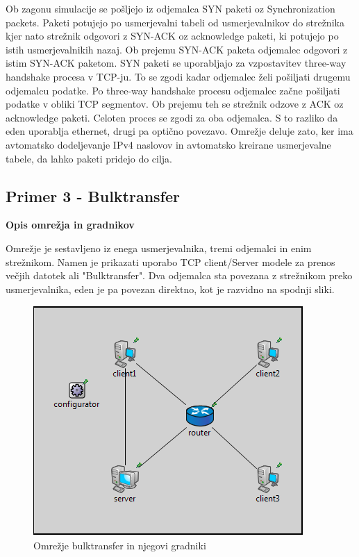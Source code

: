 \documentclass[11pt, a4paper, slovene]{book}
\begin{document}
Ob zagonu simulacije se pošljejo iz odjemalca SYN paketi oz Synchronization packets. Paketi potujejo po usmerjevalni tabeli od usmerjevalnikov do strežnika kjer nato strežnik odgovori z SYN-ACK oz acknowledge paketi, ki potujejo po istih usmerjevalnikih nazaj. Ob prejemu SYN-ACK paketa odjemalec odgovori z istim SYN-ACK paketom. SYN paketi se uporabljajo za vzpostavitev three-way handshake procesa v TCP-ju. To se zgodi kadar odjemalec želi pošiljati drugemu odjemalcu podatke. Po three-way handshake procesu odjemalec začne pošiljati podatke v obliki TCP segmentov. Ob prejemu teh se strežnik odzove z ACK oz acknowledge paketi. Celoten proces se zgodi za oba odjemalca. S to razliko da eden uporablja ethernet, drugi pa optično povezavo. Omrežje deluje zato, ker ima avtomatsko dodeljevanje IPv4 naslovov in avtomatsko kreirane usmerjevalne tabele, da lahko paketi pridejo do cilja.


\subsection{Primer 3 - Bulktransfer}
\large \bf Opis omrežja in gradnikov
\normalfont \normalsize 

Omrežje je sestavljeno iz enega usmerjevalnika, tremi odjemalci in enim strežnikom. Namen je prikazati uporabo TCP client/Server modele za prenos večjih datotek ali "Bulktransfer". Dva odjemalca sta povezana z strežnikom preko usmerjevalnika, eden je pa povezan direktno, kot je razvidno na spodnji sliki.
\pagebreak
\begin{figure}[h]
	\centering
	\includegraphics[width=\textwidth]{BulkTransfer.png}
	\caption{Omrežje bulktransfer in njegovi gradniki}
	\label{bulkTransfer}	
\end{figure}
\end{document}
